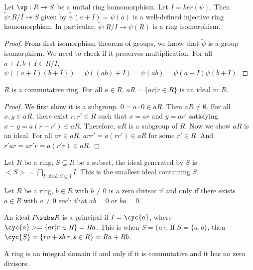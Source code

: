 \documentclass[10pt]{article}
\begin{document}
\begin{theorem}
    Let $\vp: R\xrightarrow{} S$ be a unital ring homomorphism. Let $I=ker(\psi)$. Then $\widetilde{\psi}: R/I\xrightarrow{}S$ given by $\widetilde{\psi}(a+I)=\psi(a)$ is a well-defined injective ring homomorphism. In particular, $\widetilde{\psi}: R/I\xrightarrow{}\psi(R)$ is a ring isomorphism.
\end{theorem}
\begin{proof}
    From first isomorphism theorem of groups, we know that $\widetilde{\psi}$ is a group isomorphism. We need to check if it preserves multiplication. For all $a+I, b+I\in R/I$, $\widetilde{\psi}((a+I)(b+I))=\widetilde{\psi}((ab)+I)=\psi(ab)=\widetilde{\psi}(a+I)\widetilde{\psi}(b+I)$.
\end{proof}
\begin{lemma}
    $R$ is a commutative ring. For all $a\in R$, $aR=\{ar|r\in R\}$ is an ideal in $R$.
\end{lemma}
\begin{proof}
    We first show it is a subgroup. $0=a\cdot 0\in aR.$ Then $aR\neq\emptyset$. For all $x, y\in aR$, there exist $ r, r'\in R$ such that $x=ar$ and $y=ar'$ satisfying $x-y=a(r-r')\in aR$. Therefore, $aR$ is a subgroup of $R$. Now we show $aR$ is an ideal. For all $ar\in aR$, $arr' = a(rr')\in aR$ for some $r'\in R$. And $r'ar=ar'r=a(r'r)\in aR$.
\end{proof}
\begin{definition}
    Let $R$ be a ring, $S\subseteq R$ be a subset, the ideal generated by $S$ is $<S> = \bigcap_{I: \text{ideal}; S\subseteq I}I$. This is the smallest ideal containing $S$. 
\end{definition}
\begin{definition}
    Let $R$ be a ring, $b\in R$ with $b\neq 0$ is a zero divisor if and only if there exists $a\in R$ with $a\neq 0$ such that $ab=0$ or $ba=0$.
\end{definition}
\begin{definition}
    An ideal $I\sube R$ is a principal if $I=\cyc{a}$, where $\cyc{a}>=\{ar|r\in R\}=Ra$. This is when $S=\{a\}$. If $S=\{a,b\}$, then $\cyc{S} = \{ra + sb|r,s\in R\} = Ra+Rb$.
\end{definition}
\begin{definition}
    A ring is an integral domain if and only if it  is commutative and it  has no zero divisors.
\end{definition}
\end{document}
